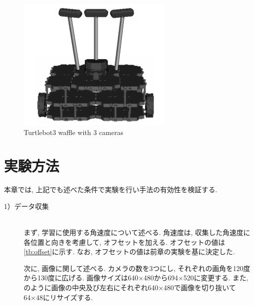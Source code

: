 \begin{figure}[h]
  \centering
  \includegraphics[keepaspectratio, scale=0.55]{images/turtlebot3.png}
  \caption{Turtlebot3 waffle with 3 cameras}
  \label{Fig:turtlebot3_3cam}
\end{figure}

\section{実験方法}
本章では, 上記でも述べた条件で実験を行い手法の有効性を検証する. 

\begin{description}
  \item[1）データ収集]\mbox{}\\ \hspace*{3mm}まず, 学習に使用する角速度について述べる. 角速度は, 収集した角速度に各位置と向きを考慮して, オフセットを加える. オフセットの値は\ref{tb:offset}に示す. なお, オフセットの値は前章の実験を基に決定した. \par \hspace*{3mm}次に, 画像に関して述べる. カメラの数を3つにし, それぞれの画角を120度から130度に広げる. 画像サイズは640×480から694×520に変更する. また, のように画像の中央及び左右にそれぞれ640×480で画像を切り抜いて64×48にリサイズする. 
\end{description}

